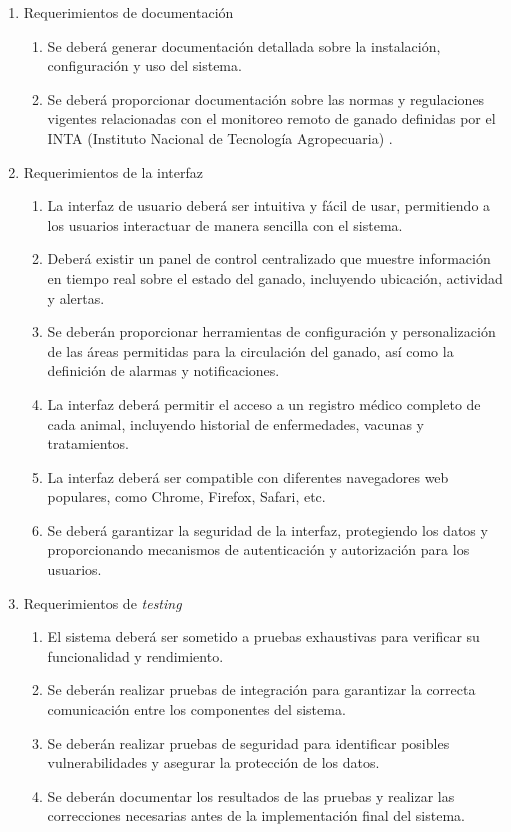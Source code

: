 \documentclass[
11pt, %
]{charter}
\begin{document}
\begin{enumerate}
	\item Requerimientos de documentación
		\begin{enumerate}
			\item Se deberá generar documentación detallada sobre la instalación, configuración y uso del sistema.
			\item Se deberá proporcionar documentación sobre las normas y regulaciones vigentes relacionadas con el monitoreo remoto de ganado definidas por el INTA (Instituto Nacional de Tecnología Agropecuaria) .
		\end{enumerate}
	
	\item Requerimientos de la interfaz
		\begin{enumerate}			
			\item La interfaz de usuario deberá ser intuitiva y fácil de usar, permitiendo a los usuarios interactuar de manera sencilla con el sistema.
			\item Deberá existir un panel de control centralizado que muestre información en tiempo real sobre el estado del ganado, incluyendo ubicación, actividad y alertas.
			\item  Se deberán proporcionar herramientas de configuración y personalización de las áreas permitidas para la circulación del ganado, así como la definición de alarmas y notificaciones.
			\item La interfaz deberá permitir el acceso a un registro médico completo de cada animal, incluyendo historial de enfermedades, vacunas y tratamientos.
			\item La interfaz deberá ser compatible con diferentes navegadores web populares, como Chrome, Firefox, Safari, etc.
			\item Se deberá garantizar la seguridad de la interfaz, protegiendo los datos y proporcionando mecanismos de autenticación y autorización para los usuarios.
		\end{enumerate}
		
	\item Requerimientos de \emph{testing}
		\begin{enumerate}
			\item El sistema deberá ser sometido a pruebas exhaustivas para verificar su funcionalidad y rendimiento.
			\item Se deberán realizar pruebas de integración para garantizar la correcta comunicación entre los componentes del sistema.
			\item Se deberán realizar pruebas de seguridad para identificar posibles vulnerabilidades y asegurar la protección de los datos.
			\item Se deberán documentar los resultados de las pruebas y realizar las correcciones necesarias antes de la implementación final del sistema.
		\end{enumerate}
		
\end{enumerate}
\end{document}
